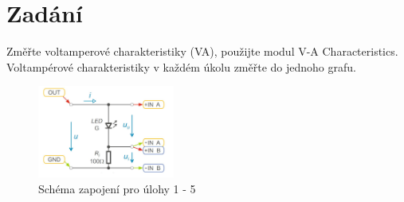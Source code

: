 \documentclass[a4paper]{article}
\begin{document}



\section*{Zadání}
Změřte voltamperové charakteristiky (VA), použijte modul V-A Characteristics. Voltampérové
charakteristiky v každém úkolu změřte do jednoho grafu.
\begin{figure}[h]
	\centering
	\includegraphics[width=0.4\textwidth]{zapojeni1.png}
	\caption{Schéma zapojení pro úlohy 1 - 5}
	\label{fig:schema15}
\end{figure}
\end{document}
